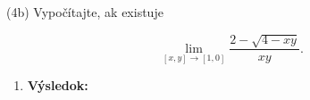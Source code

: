 \pr (4b) Vypočítajte, ak existuje

$$
\lim\limits_{
[x,y]\rightarrow [1,0]}
\frac{2-\sqrt{4-xy}}{xy}.
$$
\begin{enumerate}
\item[]\textbf{Výsledok:}\gr
\end{enumerate}
